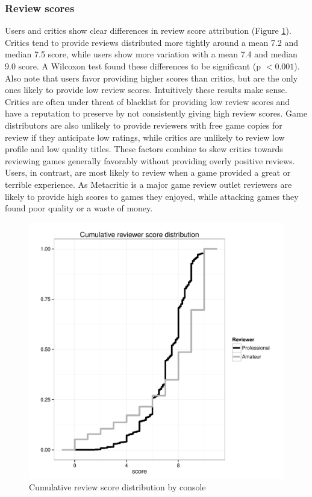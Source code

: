 \documentclass[letterpaper]{article}
\begin{document}
\subsubsection{Review scores}
Users and critics show clear differences in review score attribution (Figure \ref{fig:revscore_console}). Critics tend to provide reviews distributed more tightly around a mean 7.2 and median 7.5 score, while users show more variation with a mean 7.4 and median 9.0 score. A Wilcoxon test found these differences to be significant (p $< 0.001$). Also note that users favor providing higher scores than critics, but are the only ones likely to provide low review scores.
Intuitively these results make sense. Critics are often under threat of blacklist for providing low review scores and have a reputation to preserve by not consistently giving high review scores. Game distributors are also unlikely to provide reviewers with free game copies for review if they anticipate low ratings, while critics are unlikely to review low profile and low quality titles. These factors combine to skew critics towards reviewing games generally favorably without providing overly positive reviews. Users, in contrast, are most likely to review when a game provided a great or terrible experience. As Metacritic is a major game review outlet reviewers are likely to provide high scores to games they enjoyed, while attacking games they found poor quality or a waste of money.

\begin{figure}[tb]
\centering
\includegraphics[width=\linewidth]{./console_reviews_score_ecdf}
\caption{Cumulative review score distribution by console}
\label{fig:revscore_console}
\end{figure}
\end{document}
